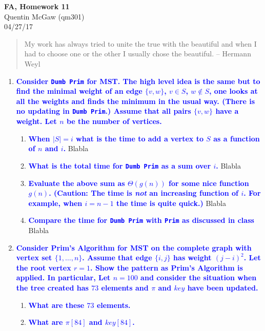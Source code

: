 \documentclass[11pt]{article}
\begin{document}
\begin{center} {\Large\bf FA, Homework 11} \\ Quentin McGaw (qm301) \\ 04/27/17
\end{center}

\begin{quote}
My work has always tried to unite the true with the beautiful and
when I had to choose one or the other I usually chose the beautiful.
--  Hermann Weyl
\end{quote}

\begin{enumerate}
\item \textbf{\textcolor{blue}{Consider {\tt Dumb Prim} for MST.  The high level idea is the same but to find the minimal weight of an edge $\{v,w\}$, $v\in S$, $w\not\in S$, one looks at all the weights and finds the minimum in the usual way. (There is no updating in {\tt Dumb Prim}.) Assume that all pairs $\{v,w\}$ have a weight.  Let $n$ be the number of vertices.}}
\begin{enumerate}
    \item \textbf{\textcolor{blue}{When $|S|=i$ what is the time to add a vertex to $S$ as a function of $n$ and $i$.}}
    Blabla
    \item \textbf{\textcolor{blue}{What is the total time for {\tt Dumb Prim} as a sum over $i$.}}
    Blabla
    \item \textbf{\textcolor{blue}{Evaluate the above sum as $\Theta(g(n))$ for some nice function $g(n)$. (Caution:  The time is {\em not} an increasing function of $i$.  For example, when $i=n-1$ the time is quite quick.)}}
    Blabla
    \item \textbf{\textcolor{blue}{Compare the time for {\tt Dumb Prim} with {\tt Prim} as discussed in class}}
    Blabla
\end{enumerate}

\item \textbf{\textcolor{blue}{Consider Prim's Algorithm for MST on the complete graph with vertex set $\{1,\ldots,n\}$.  Assume that edge $\{i,j\}$ has weight $(j-i)^2$.  Let the root vertex $r=1$.  Show the pattern as Prim's Algorithm is applied. In particular, Let $n=100$ and consider the situation when the tree created has $73$ elements and $\pi$ and $key$ have been updated.}}
\begin{enumerate}
    \item \textbf{\textcolor{blue}{What are these $73$ elements.}}
        \\ 
    \item \textbf{\textcolor{blue}{What are $\pi[84]$ and $key[84]$.}}
\end{enumerate}


\end{enumerate}
\end{document}
